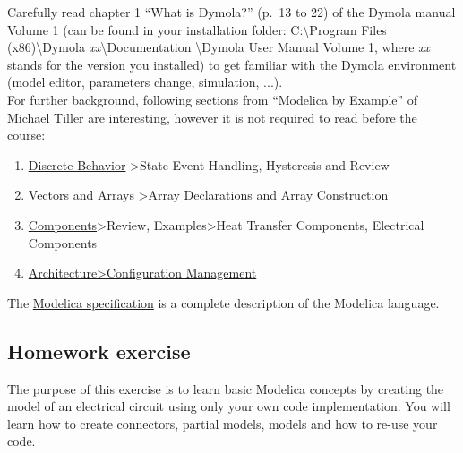 \documentclass[10pt,a4paper]{article}
\begin{document}
Carefully read chapter 1 ``What is Dymola?'' (p.~13 to 22) of the Dymola manual 
Volume 1 (can be found in your installation folder: C:\textbackslash Program 
Files (x86)\textbackslash Dymola \textit{xx}\textbackslash Documentation 
\textbackslash Dymola User Manual Volume 1, where \textit{xx} stands for the 
version you installed) to get familiar with the Dymola environment (model 
editor, parameters change, simulation, ...).\\

For further background, following sections from ``Modelica by Example'' of 
Michael Tiller are interesting, however it is not required to read before the 
course: 
\begin{enumerate}
\item \href{http://book.xogeny.com/behavior/discrete/}{Discrete Behavior} >State Event Handling, Hysteresis and Review
\item	\href{http://book.xogeny.com/behavior/arrays/}{Vectors and Arrays} >Array Declarations and Array Construction
\item	\href{http://book.xogeny.com/components/components/#review}{Components}>Review, Examples>Heat Transfer Components, Electrical Components
\item \href{http://book.xogeny.com/components/architectures/replaceable/}{Architecture>Configuration Management}
		
\end{enumerate}

The \href{https://www.modelica.org/documents/ModelicaSpec34.pdf}{Modelica specification} is a complete description of the Modelica language.


\subsection*{Homework exercise}
The purpose of this exercise is to learn basic Modelica concepts by creating the model of an electrical circuit 
using only your own code implementation. 
You will learn how to create connectors, partial models, 
models and how to re-use your code.
\end{document}
